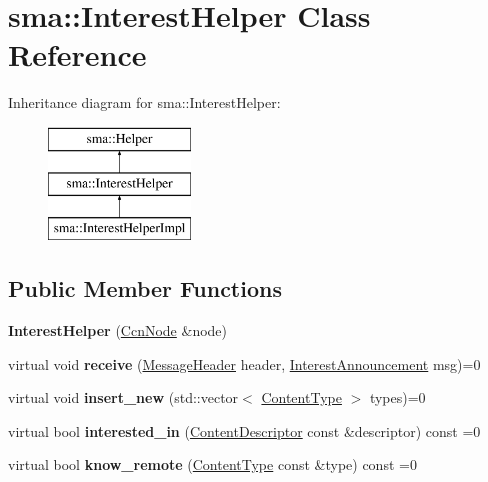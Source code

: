 \hypertarget{classsma_1_1InterestHelper}{\section{sma\-:\-:Interest\-Helper Class Reference}
\label{classsma_1_1InterestHelper}
}
Inheritance diagram for sma\-:\-:Interest\-Helper\-:\begin{figure}[H]
\begin{center}
\leavevmode
\includegraphics[height=3.000000cm]{classsma_1_1InterestHelper}
\end{center}
\end{figure}
\subsection*{Public Member Functions}
\begin{DoxyCompactItemize}
\item 
\hypertarget{classsma_1_1InterestHelper_a1b8f165aa3922a94d80b50787fc86d8d}{{\bfseries Interest\-Helper} (\hyperlink{classsma_1_1CcnNode}{Ccn\-Node} \&node)}\label{classsma_1_1InterestHelper_a1b8f165aa3922a94d80b50787fc86d8d}

\item 
\hypertarget{classsma_1_1InterestHelper_a4adb1b1209a8623e6551fa06ba6cec4f}{virtual void {\bfseries receive} (\hyperlink{structsma_1_1MessageHeader}{Message\-Header} header, \hyperlink{structsma_1_1InterestAnnouncement}{Interest\-Announcement} msg)=0}\label{classsma_1_1InterestHelper_a4adb1b1209a8623e6551fa06ba6cec4f}

\item 
\hypertarget{classsma_1_1InterestHelper_a1a973f3ba1575c57dc7da86691c07d4f}{virtual void {\bfseries insert\-\_\-new} (std\-::vector$<$ \hyperlink{structsma_1_1ContentType}{Content\-Type} $>$ types)=0}\label{classsma_1_1InterestHelper_a1a973f3ba1575c57dc7da86691c07d4f}

\item 
\hypertarget{classsma_1_1InterestHelper_a433f46b2a5d7af0576cf228fddf92260}{virtual bool {\bfseries interested\-\_\-in} (\hyperlink{structsma_1_1ContentDescriptor}{Content\-Descriptor} const \&descriptor) const =0}\label{classsma_1_1InterestHelper_a433f46b2a5d7af0576cf228fddf92260}

\item 
\hypertarget{classsma_1_1InterestHelper_ad56a3e52c84592088e32f22a1632bc14}{virtual bool {\bfseries know\-\_\-remote} (\hyperlink{structsma_1_1ContentType}{Content\-Type} const \&type) const =0}\label{classsma_1_1InterestHelper_ad56a3e52c84592088e32f22a1632bc14}

\end{DoxyCompactItemize}
